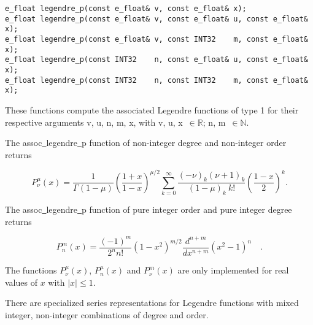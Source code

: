 \begin{lstlisting}
e_float legendre_p(const e_float& v, const e_float& x);
e_float legendre_p(const e_float& v, const e_float& u, const e_float& x);
e_float legendre_p(const e_float& v, const INT32    m, const e_float& x);
e_float legendre_p(const INT32    n, const e_float& u, const e_float& x);
e_float legendre_p(const INT32    n, const INT32    m, const e_float& x);
\end{lstlisting}

\vspace{6.0pt}

 These functions compute the associated Legendre functions
of type 1 for their respective arguments {\courier v}, {\courier u},
{\courier n}, {\courier m}, {\courier x},
with {\courier v}, {\courier u}, {\courier x}~$\in\mathbb{R}$;
{\courier n}, {\courier m}~$\in\mathbb{N}$.

\vspace{6.0pt}

 The {\courier assoc\underline\ legendre\underline\ p} function
of non-integer degree and non-integer order
returns~\cite{wolframfunctions:website}

\begin{equation}
P_{\nu}^{\mu}(x) =
\frac{1}{\Gamma(1-\mu)}
\left(\frac{1+x}{1-x}\right)^{\mu/2}
\sum_{k=0}^{\infty}
\frac{(-\nu)_{k}(\nu+1)_{k}}{(1 - \mu)_{k} \ k!}
\left(\frac{1-x}{2}\right)^k.
\end{equation}

\vspace{6.0pt}

 The {\courier assoc\underline\ legendre\underline\ p} function
of pure integer order and pure integer degree
returns~\cite{wolframmathworld:website}

\begin{equation}
P_{n}^{m}(x) =
\frac{(-1)^m}{2^{n}n!} (1-x^{2})^{m/2}
\frac{d^{n+m}}{dx^{n+m}} (x^{2}-1)^{n}\quad.
\end{equation}

\vspace{6.0pt}

 The functions $P_{\nu}^{\mu}(x)$, $P_{n}^{\mu}(x)$ and $P_{\nu}^{m}(x)$
are only implemented for real values of $x$ with $|x|\leq 1$.

\vspace{6.0pt}

 There are specialized series representations for Legendre
functions with mixed integer, non-integer combinations of degree and order.

